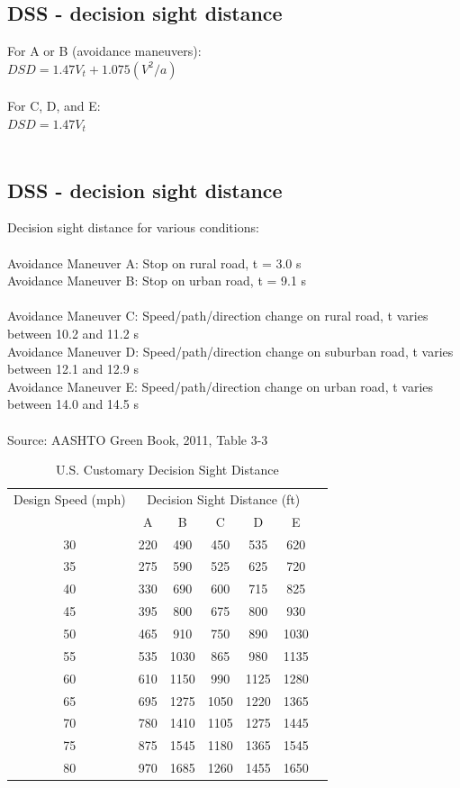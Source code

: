 \documentclass{article}
\begin{document}
  \subsection{DSS - decision sight distance}
  For A or B (avoidance maneuvers): \\
  $DSD = 1.47V_{t} + 1.075(V^2/a)$ \\
  \\
  For C, D, and E: \\
  $DSD = 1.47V_{t}$ \\
  \\

  \subsection{DSS - decision sight distance}
  Decision sight distance for various conditions: \\
  \\
  Avoidance Maneuver A: Stop on rural road, t = 3.0 s\\
  Avoidance Maneuver B: Stop on urban road, t = 9.1 s\\
  \\
  Avoidance Maneuver C: Speed/path/direction change on rural road, t varies between 10.2 and 11.2 s \\
  Avoidance Maneuver D: Speed/path/direction change on suburban road, t varies between 12.1 and 12.9 s \\
  Avoidance Maneuver E: Speed/path/direction change on urban road, t varies between 14.0 and 14.5 s \\
  \\
  Source: AASHTO Green Book, 2011, Table 3-3\\



  \begin{table}[h!]
  \centering
  \caption{U.S. Customary Decision Sight Distance}
  \label{tab:us_customary_decision_sight_distance}
  \begin{tabular}{ccccccc}
  \toprule
  Design Speed (mph) & \multicolumn{5}{c}{Decision Sight Distance (ft)} &  \\
  \cmidrule(lr){2-6}
  & A & B & C & D & E & \\
  \midrule
  30 & 220 & 490 & 450 & 535 & 620 & \\
  35 & 275 & 590 & 525 & 625 & 720 & \\
  40 & 330 & 690 & 600 & 715 & 825 & \\
  45 & 395 & 800 & 675 & 800 & 930 & \\
  50 & 465 & 910 & 750 & 890 & 1030 & \\
  55 & 535 & 1030 & 865 & 980 & 1135 & \\
  60 & 610 & 1150 & 990 & 1125 & 1280 & \\
  65 & 695 & 1275 & 1050 & 1220 & 1365 & \\
  70 & 780 & 1410 & 1105 & 1275 & 1445 & \\
  75 & 875 & 1545 & 1180 & 1365 & 1545 & \\
  80 & 970 & 1685 & 1260 & 1455 & 1650 & \\
  \bottomrule
  \end{tabular}
  \end{table}
\end{document}
